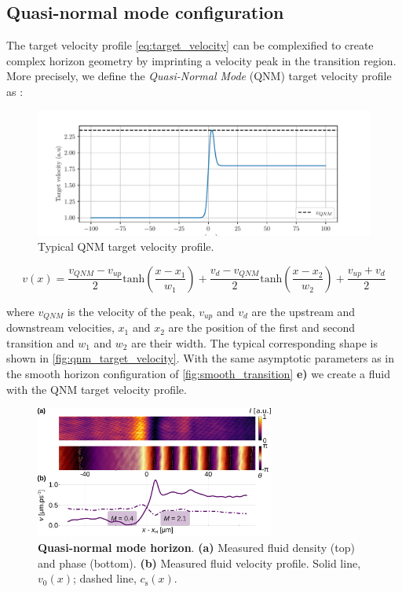 \subsection{Quasi-normal mode configuration}

The target velocity profile \autoref{eq:target_velocity} can be complexified to create complex horizon geometry by imprinting 
a velocity peak in the transition region. More precisely, we define the \textit{Quasi-Normal Mode} (QNM) target velocity profile as :

\begin{figure}
    \centering
    \includegraphics[width=1\textwidth]{chap3_custom_st/fig/qnm_target_velocity.pdf}
    \caption{Typical QNM target velocity profile.}
    \label{fig:qnm_target_velocity}
\end{figure}


\begin{equation}
    v(x)= \frac{v_{QNM}-v_{up}}{2}\mathrm{tanh}(\frac{x-x_1}{w_1})+ \frac{v_{d}-v_{QNM}}{2}\mathrm{tanh}(\frac{x-x_2}{w_2})+\frac{v_{up}+v_{d}}{2}
    \label{eq:target_velocity_qnm}
\end{equation}

where $v_{QNM}$ is the velocity of the peak, $v_{up}$ and $v_{d}$ are the upstream and downstream velocities, $x_1$ and $x_2$ are the position of the first and second transition and $w_1$ and $w_2$ are their width.
The typical corresponding shape is shown in \autoref{fig:qnm_target_velocity}.
With the same asymptotic parameters as in the smooth horizon configuration of \autoref{fig:smooth_transition} \textbf{e)} we create a fluid with the QNM target velocity profile.
\begin{figure}
    \centering
    \includegraphics[width=0.7\textwidth]{chap3_custom_st/fig/bh_qnm.pdf}
    \caption{\textbf{Quasi-normal mode horizon}.    
    \textbf{(a)} Measured fluid density (top) and phase (bottom).
    \textbf{(b)} Measured fluid velocity profile.
    Solid line, $v_0(x)$; dashed line, $c_\mathrm{s}(x)$.}
    \label{fig:bh_qnm}
\end{figure}

